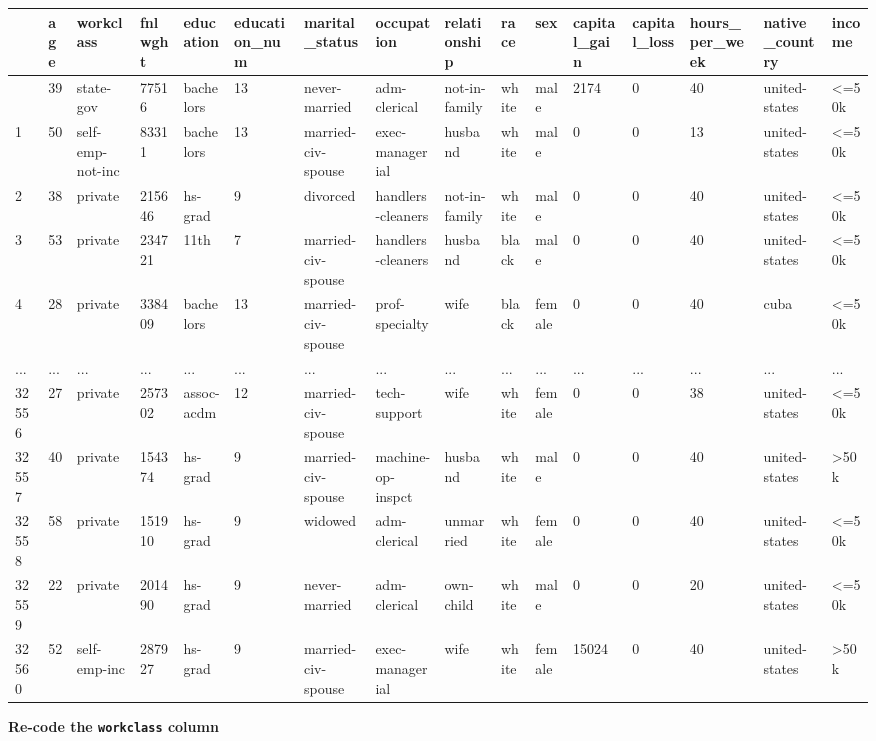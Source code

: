 \documentclass[
  letterpaper,
  DIV=11,
  numbers=noendperiod]{scrartcl}
\begin{document}
\begin{longtable}[]{@{}llllllllllllllll@{}}
\toprule\noalign{}
& age & workclass & fnlwght & education & education\_num &
marital\_status & occupation & relationship & race & sex & capital\_gain
& capital\_loss & hours\_per\_week & native\_country & income \\
\midrule\noalign{}
\endhead
\bottomrule\noalign{}
\endlastfoot
0 & 39 & state-gov & 77516 & bachelors & 13 & never-married &
adm-clerical & not-in-family & white & male & 2174 & 0 & 40 &
united-states & \textless=50k \\
1 & 50 & self-emp-not-inc & 83311 & bachelors & 13 & married-civ-spouse
& exec-managerial & husband & white & male & 0 & 0 & 13 & united-states
& \textless=50k \\
2 & 38 & private & 215646 & hs-grad & 9 & divorced & handlers-cleaners &
not-in-family & white & male & 0 & 0 & 40 & united-states &
\textless=50k \\
3 & 53 & private & 234721 & 11th & 7 & married-civ-spouse &
handlers-cleaners & husband & black & male & 0 & 0 & 40 & united-states
& \textless=50k \\
4 & 28 & private & 338409 & bachelors & 13 & married-civ-spouse &
prof-specialty & wife & black & female & 0 & 0 & 40 & cuba &
\textless=50k \\
... & ... & ... & ... & ... & ... & ... & ... & ... & ... & ... & ... &
... & ... & ... & ... \\
32556 & 27 & private & 257302 & assoc-acdm & 12 & married-civ-spouse &
tech-support & wife & white & female & 0 & 0 & 38 & united-states &
\textless=50k \\
32557 & 40 & private & 154374 & hs-grad & 9 & married-civ-spouse &
machine-op-inspct & husband & white & male & 0 & 0 & 40 & united-states
& \textgreater50k \\
32558 & 58 & private & 151910 & hs-grad & 9 & widowed & adm-clerical &
unmarried & white & female & 0 & 0 & 40 & united-states &
\textless=50k \\
32559 & 22 & private & 201490 & hs-grad & 9 & never-married &
adm-clerical & own-child & white & male & 0 & 0 & 20 & united-states &
\textless=50k \\
32560 & 52 & self-emp-inc & 287927 & hs-grad & 9 & married-civ-spouse &
exec-managerial & wife & white & female & 15024 & 0 & 40 & united-states
& \textgreater50k \\
\end{longtable}

\textbf{Re-code the \texttt{workclass} column}
\end{document}
